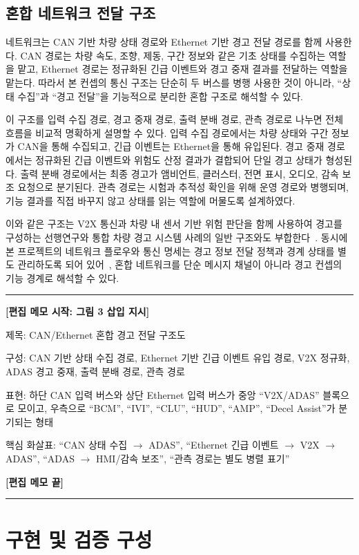 \documentclass[11pt,a4paper]{article}
\newenvironment{editmemo}[1]
{
\par\noindent\rule{\linewidth}{0.4pt}\par
\noindent\textbf{[편집 메모 시작: #1]}\par
\small\itshape
}
{
\par\normalsize\normalfont
\noindent\textbf{[편집 메모 끝]}\par
\noindent\rule{\linewidth}{0.4pt}\par
}
\begin{document}
\subsection{혼합 네트워크 전달 구조}

네트워크는 CAN 기반 차량 상태 경로와 Ethernet 기반 경고 전달 경로를 함께 사용한다. CAN 경로는 차량 속도, 조향, 제동, 구간 정보와 같은 기초 상태를 수집하는 역할을 맡고, Ethernet 경로는 정규화된 긴급 이벤트와 경고 중재 결과를 전달하는 역할을 맡는다. 따라서 본 컨셉의 통신 구조는 단순히 두 버스를 병행 사용한 것이 아니라, ``상태 수집''과 ``경고 전달''을 기능적으로 분리한 혼합 구조로 해석할 수 있다.

이 구조를 입력 수집 경로, 경고 중재 경로, 출력 분배 경로, 관측 경로로 나누면 전체 흐름을 비교적 명확하게 설명할 수 있다. 입력 수집 경로에서는 차량 상태와 구간 정보가 CAN을 통해 수집되고, 긴급 이벤트는 Ethernet을 통해 유입된다. 경고 중재 경로에서는 정규화된 긴급 이벤트와 위험도 산정 결과가 결합되어 단일 경고 상태가 형성된다. 출력 분배 경로에서는 최종 경고가 앰비언트, 클러스터, 전면 표시, 오디오, 감속 보조 요청으로 분기된다. 관측 경로는 시험과 추적성 확인을 위해 운영 경로와 병행되며, 기능 결과를 직접 바꾸지 않고 상태를 읽는 역할에 머물도록 설계하였다.

이와 같은 구조는 V2X 통신과 차량 내 센서 기반 위험 판단을 함께 사용하여 경고를 구성하는 선행연구와 통합 차량 경고 시스템 사례의 일반 구조와도 부합한다~\cite{sensors_v2x_collision,nhtsa_ivbss}. 동시에 본 프로젝트의 네트워크 플로우와 통신 명세는 경고 정보 전달 정책과 경계 상태를 별도 관리하도록 되어 있어~\cite{comm_spec,nw_flow}, 혼합 네트워크를 단순 메시지 채널이 아니라 경고 컨셉의 기능 경계로 해석할 수 있다.

\begin{editmemo}{그림 3 삽입 지시}
제목: CAN/Ethernet 혼합 경고 전달 구조도

구성: CAN 기반 상태 수집 경로, Ethernet 기반 긴급 이벤트 유입 경로, V2X 정규화, ADAS 경고 중재, 출력 분배 경로, 관측 경로

표현: 하단 CAN 입력 버스와 상단 Ethernet 입력 버스가 중앙 ``V2X/ADAS'' 블록으로 모이고, 우측으로 ``BCM'', ``IVI'', ``CLU'', ``HUD'', ``AMP'', ``Decel Assist''가 분기되는 형태

핵심 화살표: ``CAN 상태 수집 $\rightarrow$ ADAS'', ``Ethernet 긴급 이벤트 $\rightarrow$ V2X $\rightarrow$ ADAS'', ``ADAS $\rightarrow$ HMI/감속 보조'', ``관측 경로는 별도 병렬 표기''
\end{editmemo}

\section{구현 및 검증 구성}
\end{document}
